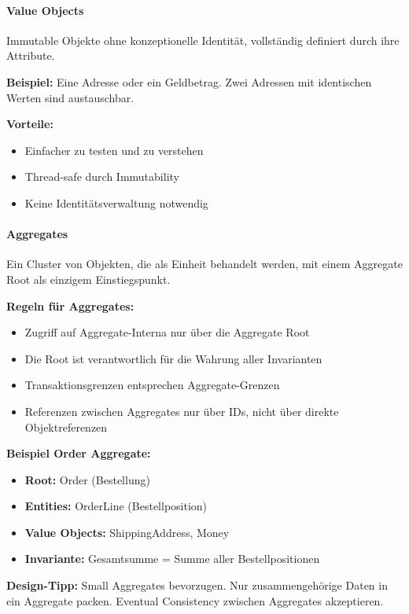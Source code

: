 \paragraph{Value Objects}
Immutable Objekte ohne konzeptionelle Identität, vollständig definiert durch ihre Attribute.

\textbf{Beispiel:} Eine Adresse oder ein Geldbetrag. Zwei Adressen mit identischen Werten sind austauschbar.

\textbf{Vorteile:}
\begin{itemize}
\item Einfacher zu testen und zu verstehen
\item Thread-safe durch Immutability
\item Keine Identitätsverwaltung notwendig
\end{itemize}

\paragraph{Aggregates}
Ein Cluster von Objekten, die als Einheit behandelt werden, mit einem Aggregate Root als einzigem Einstiegspunkt.

\textbf{Regeln für Aggregates:}
\begin{itemize}
\item Zugriff auf Aggregate-Interna nur über die Aggregate Root
\item Die Root ist verantwortlich für die Wahrung aller Invarianten
\item Transaktionsgrenzen entsprechen Aggregate-Grenzen
\item Referenzen zwischen Aggregates nur über IDs, nicht über direkte Objektreferenzen
\end{itemize}

\textbf{Beispiel Order Aggregate:}
\begin{itemize}
\item \textbf{Root:} Order (Bestellung)
\item \textbf{Entities:} OrderLine (Bestellposition)
\item \textbf{Value Objects:} ShippingAddress, Money
\item \textbf{Invariante:} Gesamtsumme = Summe aller Bestellpositionen
\end{itemize}

\textbf{Design-Tipp:} Small Aggregates bevorzugen. Nur zusammengehörige Daten in ein Aggregate packen. Eventual Consistency zwischen Aggregates akzeptieren.

